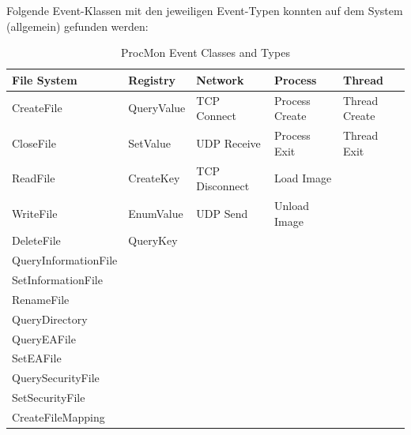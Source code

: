 \documentclass{article}
\begin{document}
	\pagebreak
	
	\noindent Folgende Event-Klassen mit den jeweiligen Event-Typen konnten auf dem System (allgemein) gefunden werden:\\
	\begin{table}[h]
		\centering
		\begin{tabular}{|m{3.3cm}|m{2.2cm}|m{2.6cm}|m{2.4cm}|m{2.4cm}|}
			\hline
			\textbf{File System} & \textbf{Registry} & \textbf{Network} & \textbf{Process} & \textbf{Thread} \\ \hline
			CreateFile           & QueryValue        & TCP Connect      & Process Create   & Thread Create   \\ \hline
			CloseFile            & SetValue          & UDP Receive      & Process Exit     & Thread Exit     \\ \hline
			ReadFile             & CreateKey         & TCP Disconnect   & Load Image       &                 \\ \hline
			WriteFile            & EnumValue         & UDP Send         & Unload Image     &                 \\ \hline
			DeleteFile           & QueryKey          &                  &                  &                 \\ \hline
			QueryInformationFile &                   &                  &                  &                 \\ \hline
			SetInformationFile   &                   &                  &                  &                 \\ \hline
			RenameFile           &                   &                  &                  &                 \\ \hline
			QueryDirectory       &                   &                  &                  &                 \\ \hline
			QueryEAFile          &                   &                  &                  &                 \\ \hline
			SetEAFile            &                   &                  &                  &                 \\ \hline
			QuerySecurityFile    &                   &                  &                  &                 \\ \hline
			SetSecurityFile      &                   &                  &                  &                 \\ \hline
			CreateFileMapping    &                   &                  &                  &                 \\ \hline
		\end{tabular}
		\caption{ProcMon Event Classes and Types}
		\label{table:procmon-events}
	\end{table}
\end{document}
